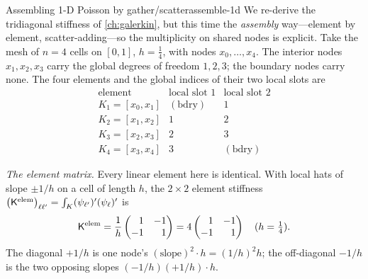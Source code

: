 \begin{workedexample}{Assembling 1-D Poisson by gather/scatter}{assemble-1d}
\label{wex:assemble-1d}
We re-derive the tridiagonal stiffness of \cref{ch:galerkin}, but this time the
\emph{assembly} way---element by element, scatter-adding---so the multiplicity on
shared nodes is explicit. Take the mesh of $n=4$ cells on $[0,1]$, $h=\tfrac14$,
with nodes $x_0,\dots,x_4$. The interior nodes $x_1,x_2,x_3$ carry the global
degrees of freedom $1,2,3$; the boundary nodes carry none. The four elements and
the global indices of their two local slots are
\[
\begin{array}{c|c|c}
\text{element} & \text{local slot }1 & \text{local slot }2\\\hline
K_1=[x_0,x_1] & (\text{bdry}) & 1\\
K_2=[x_1,x_2] & 1 & 2\\
K_3=[x_2,x_3] & 2 & 3\\
K_4=[x_3,x_4] & 3 & (\text{bdry})
\end{array}
\]

\emph{The element matrix.} Every linear element here is identical. With local
hats of slope $\pm1/h$ on a cell of length $h$, the $2\times2$ element stiffness
$\bigl(\mathsf{K}^{\mathrm{elem}}\bigr)_{\ell\ell'}=\int_K(\psi_{\ell'})'(\psi_\ell)'$
is
\[
\mathsf{K}^{\mathrm{elem}}=\frac1h\begin{pmatrix}\phantom{-}1 & -1\\ -1 & \phantom{-}1\end{pmatrix}
=4\begin{pmatrix}\phantom{-}1 & -1\\ -1 & \phantom{-}1\end{pmatrix}\quad(h=\tfrac14).
\]
The diagonal $+1/h$ is one node's $(\text{slope})^2\cdot h=(1/h)^2 h$; the
off-diagonal $-1/h$ is the two opposing slopes $(-1/h)(+1/h)\cdot h$.


\end{workedexample}
